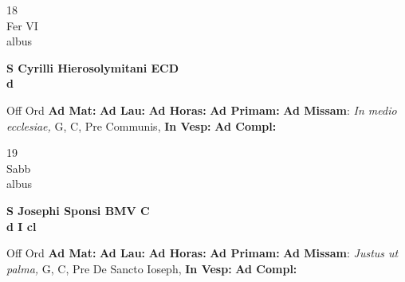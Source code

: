 \documentclass[10pt, openany]{book}
\begin{document}
    \begin{center}
        \begin{minipage}{3.5in}
            \vspace{2em}
            \begin{minipage}{0.5in}
                {\Huge 18} \\
                {\normalsize Fer VI} \\
                {\normalsize albus}
            \end{minipage}
            \begin{minipage}{3.0in}
                \textbf{ \large S Cyrilli Hierosolymitani ECD \\
                \textnormal{\normalsize d}} \\ 
            \end{minipage}
            \begin{justify}Off Ord
                \textbf{Ad Mat: }
                \textbf{Ad Lau: }
                \textbf{Ad Horas: }
                \textbf{Ad Primam: }\textbf{Ad Missam}: \textit{In medio ecclesiae,} G, C, Pre Communis,  
                \textbf{In Vesp: }
                \textbf{Ad Compl: }
            \end{justify}
        \end{minipage}
    \end{center}

    \begin{center}
        \begin{minipage}{3.5in}
            \vspace{2em}
            \begin{minipage}{0.5in}
                {\Huge 19} \\
                {\normalsize Sabb} \\
                {\normalsize albus}
            \end{minipage}
            \begin{minipage}{3.0in}
                \textbf{ \large S Josephi Sponsi BMV C \\
                \textnormal{\normalsize d I cl}} \\ 
            \end{minipage}
            \begin{justify}Off Ord
                \textbf{Ad Mat: }
                \textbf{Ad Lau: }
                \textbf{Ad Horas: }
                \textbf{Ad Primam: }\textbf{Ad Missam}: \textit{Justus ut palma,} G, C, Pre De Sancto Ioseph,  
                \textbf{In Vesp: }
                \textbf{Ad Compl: }
            \end{justify}
        \end{minipage}
    \end{center}
\end{document}
